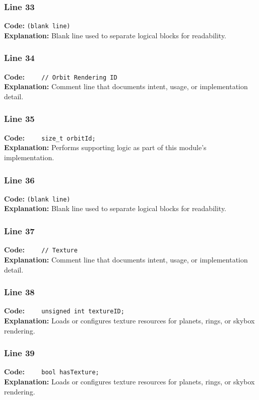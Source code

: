 \documentclass[11pt,a4paper]{article}
\begin{document}
\subsubsection*{Line 33}
\textbf{Code:} \texttt{(blank line)}\\
\textbf{Explanation:} Blank line used to separate logical blocks for readability.

\subsubsection*{Line 34}
\textbf{Code:} \verb|    // Orbit Rendering ID|\\
\textbf{Explanation:} Comment line that documents intent, usage, or implementation detail.

\subsubsection*{Line 35}
\textbf{Code:} \verb|    size_t orbitId;|\\
\textbf{Explanation:} Performs supporting logic as part of this module's implementation.

\subsubsection*{Line 36}
\textbf{Code:} \texttt{(blank line)}\\
\textbf{Explanation:} Blank line used to separate logical blocks for readability.

\subsubsection*{Line 37}
\textbf{Code:} \verb|    // Texture|\\
\textbf{Explanation:} Comment line that documents intent, usage, or implementation detail.

\subsubsection*{Line 38}
\textbf{Code:} \verb|    unsigned int textureID;|\\
\textbf{Explanation:} Loads or configures texture resources for planets, rings, or skybox rendering.

\subsubsection*{Line 39}
\textbf{Code:} \verb|    bool hasTexture;|\\
\textbf{Explanation:} Loads or configures texture resources for planets, rings, or skybox rendering.
\end{document}
